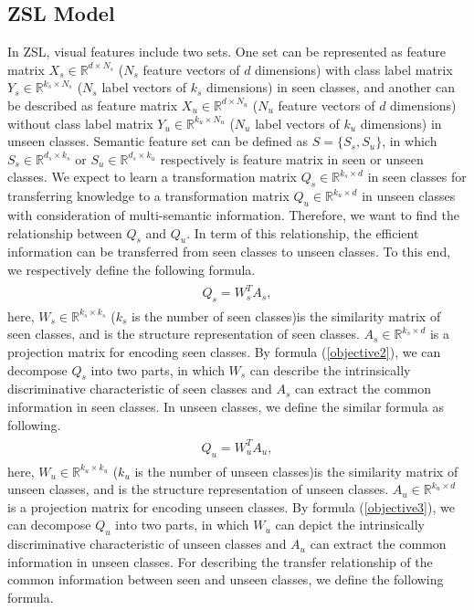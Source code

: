 \documentclass[review]{elsarticle}
\begin{document}
\subsection{ZSL Model}
In ZSL, visual features include two sets. One set can be represented as feature matrix $X_{s}\in \mathbb{R}^{d\times N_{s}}$ ($N_{s}$ feature vectors of $d$ dimensions) with class label matrix $Y_{s} \in \mathbb{R}^{k_{s}\times N_{s}}$ ($N_{s}$ label vectors of $k_{s}$ dimensions) in seen classes, and another can be described as feature matrix $X_{u}\in \mathbb{R}^{d\times N_{u}}$ ($N_{u}$ feature vectors of $d$ dimensions) without class label matrix $Y_{u}\in \mathbb{R}^{k_{u}\times N_{u}}$ ($N_{u}$ label vectors of $k_{u}$ dimensions) in unseen classes. Semantic feature set can be defined as $S=\{S_{s},S_{u}\}$, in which $S_{s}\in \mathbb{R}^{d_{s}\times k_{s}}$ or $S_{u}\in \mathbb{R}^{d_{s}\times k_{u}}$ respectively is feature matrix in seen or unseen classes. We expect to learn a transformation matrix $Q_{s} \in \mathbb{R}^{k_{s}\times d}$ in seen classes for transferring knowledge to a transformation matrix $Q_{u}\in \mathbb{R}^{k_{u}\times d}$ in unseen classes with consideration of multi-semantic information. Therefore, we want to find the relationship between $Q_{s}$ and $Q_{u}$. In term of this relationship, the efficient information can be transferred from seen classes to unseen classes. To this end, we respectively define the following formula.
\begin{align}
\label{objective2}
\begin{aligned}
Q_{s}=W_{s}^{T}A_{s},
  \end{aligned}
\end{align}
here, $W_{s}\in\mathbb{R}^{k_{s}\times k_{s}} $ ($k_{s}$ is the number of seen classes)is the similarity matrix of seen classes, and is the structure representation of seen classes. $A_{s} \in \mathbb{R}^{k_{s}\times d}$ is a projection matrix for encoding seen classes. By formula (\ref{objective2}), we can decompose $Q_{s}$  into two parts, in which $W_{s}$ can describe the intrinsically discriminative characteristic of seen classes and $A_{s}$ can extract the common information in seen classes. In unseen classes, we define the similar formula as following.
\begin{align}
\label{objective3}
\begin{aligned}
Q_{u}=W_{u}^{T}A_{u},
  \end{aligned}
\end{align}
here, $W_{u}\in\mathbb{R}^{k_{u}\times k_{u}} $ ($k_{u}$ is the number of unseen classes)is the similarity matrix of unseen classes, and is the structure representation of unseen classes. $A_{u}\in \mathbb{R}^{k_{u}\times d}$ is a projection matrix for encoding unseen classes. By  formula (\ref{objective3}), we can decompose $Q_{u}$  into two parts, in which $W_{u}$ can depict the intrinsically discriminative characteristic of unseen classes and $A_{u}$ can extract the common information in unseen classes. For describing the transfer relationship of the common information between seen and unseen classes, we define the following formula.
\end{document}
